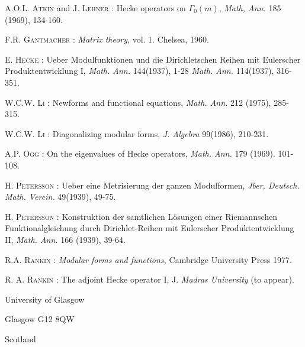 \begin{thebibliography}{99}
 \textsc{A.O.L. Atkin} and \textsc{J. Lehner :} Hecke operators on $\Gamma_{0}(m)$, {\em Math, Ann.} 185 (1969), 134-160.

 \textsc{F.R. Gantmacher :} {\em Matrix theory}, vol. 1. Chelsea, 1960.

 \textsc{E. Hecke :} Ueber Modulfunktionen und die Dirichletschen Reihen mit Eulerscher Produktentwicklung I, {\em Math. Ann.} 144(1937), 1-28 {\em Math. Ann.} 114(1937), 316-351.

 \textsc{W.C.W. Li :} Newforms and functional equations, {\em Math. Ann.} 212 (1975), 285-315.

 \textsc{W.C.W. Li :} Diagonalizing modular forms, {\em J. Algebra} 99(1986), 210-231.

 \textsc{A.P. Ogg :} On the eigenvalues of Hecke operators, {\em Math. Ann.} 179 (1969). 101-108.

 \textsc{H. Petersson :} Ueber eine Metrisierung der ganzen Modulformen, {\em Jber, Deutsch. Math. Verein.} 49(1939), 49-75.

 \textsc{H. Petersson :} Konstruktion der samtlichen L\"osungen einer Riemannschen Funktionalgleichung durch Dirichlet-Reihen mit Eulerscher Produktentwicklung II, {\em Math. Ann.} 166 (1939), 39-64.

 \textsc{R.A. Rankin :} {\em Modular forms and functions,} Cambridge University Press 1977.

 \textsc{R. A. Rankin :} The adjoint Hecke operator I, J. {\em Madras University} (to appear).
\end{thebibliography}

\bigskip
\noindent
{\small University of Glasgow}

\noindent
{\small Glasgow G12 8QW}

\noindent
{\small Scotland}

